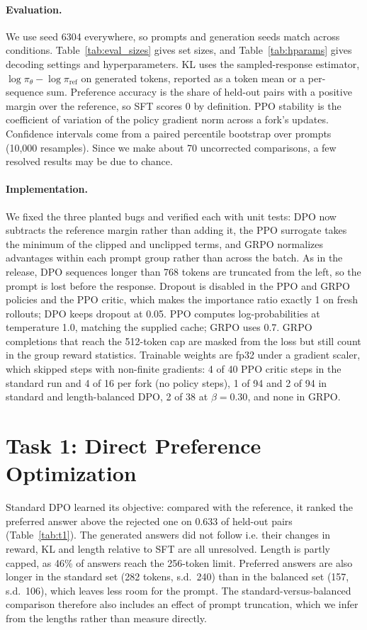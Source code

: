 \documentclass{article}
\begin{document}
\paragraph{Evaluation.}
We use seed 6304 everywhere, so prompts and generation seeds match across conditions. Table~\ref{tab:eval_sizes} gives set sizes, and Table~\ref{tab:hparams} gives decoding settings and hyperparameters. KL uses the sampled-response estimator, $\log \pi_\theta - \log \pi_{\text{ref}}$ on generated tokens, reported as a token mean or a per-sequence sum. Preference accuracy is the share of held-out pairs with a positive margin over the reference, so SFT scores 0 by definition. PPO stability is the coefficient of variation of the policy gradient norm across a fork's updates. Confidence intervals come from a paired percentile bootstrap over prompts (10,000 resamples). Since we make about 70 uncorrected comparisons, a few resolved results may be due to chance.

\paragraph{Implementation.}
We fixed the three planted bugs and verified each with unit tests: DPO now subtracts the reference margin rather than adding it, the PPO surrogate takes the minimum of the clipped and unclipped terms, and GRPO normalizes advantages within each prompt group rather than across the batch. As in the release, DPO sequences longer than 768 tokens are truncated from the left, so the prompt is lost before the response. Dropout is disabled in the PPO and GRPO policies and the PPO critic, which makes the importance ratio exactly 1 on fresh rollouts; DPO keeps dropout at 0.05. PPO computes log-probabilities at temperature 1.0, matching the supplied cache; GRPO uses 0.7. GRPO completions that reach the 512-token cap are masked from the loss but still count in the group reward statistics. Trainable weights are fp32 under a gradient scaler, which skipped steps with non-finite gradients: 4 of 40 PPO critic steps in the standard run and 4 of 16 per fork (no policy steps), 1 of 94 and 2 of 94 in standard and length-balanced DPO, 2 of 38 at $\beta=0.30$, and none in GRPO.

\section{Task 1: Direct Preference Optimization}\label{sec:t1}

Standard DPO learned its objective: compared with the reference, it ranked the preferred answer above the rejected one on 0.633 of held-out pairs (Table~\ref{tab:t1}). The generated answers did not follow i.e. their changes in reward, KL and length relative to SFT are all unresolved. Length is partly capped, as 46\% of answers reach the 256-token limit. Preferred answers are also longer in the standard set (282 tokens, s.d.\ 240) than in the balanced set (157, s.d.\ 106), which leaves less room for the prompt. The standard-versus-balanced comparison therefore also includes an effect of prompt truncation, which we infer from the lengths rather than measure directly.
\end{document}
